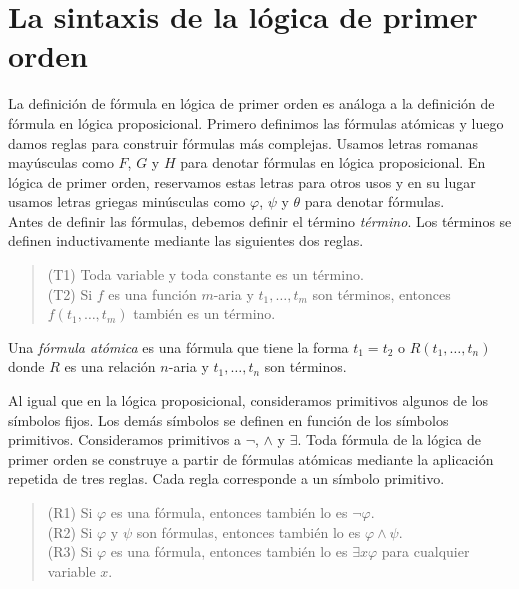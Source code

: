 \documentclass[12pt,a4paper]{book}
\begin{document}
    \section{La sintaxis de la lógica de primer orden}

    La definición de fórmula en lógica de primer orden es análoga a la definición de fórmula en lógica proposicional.
    Primero definimos las fórmulas atómicas y luego damos reglas para construir fórmulas más complejas. Usamos letras
    romanas mayúsculas como $F$, $G$ y $H$ para denotar fórmulas en lógica proposicional. En lógica de primer orden,
    reservamos estas letras para otros usos y en su lugar usamos letras griegas minúsculas como $\varphi$, $\psi$ y $\theta$
    para denotar fórmulas.\\
    Antes de definir las fórmulas, debemos definir el término \textit{término}. Los términos se definen inductivamente
    mediante las siguientes dos reglas.

    \begin{quote}
        (T1) Toda variable y toda constante es un término.\\
        (T2) Si $f$ es una función $m$-aria y $t_{1},\dots,t_{m}$ son términos, entonces $f(t_{1},\dots,t_{m})$ también es un
        término.
    \end{quote}

    \begin{definicion}\label{def:formula-atomica-fol}
        Una \textit{fórmula atómica} es una fórmula que tiene la forma $t_{1}=t_{2}$ o $R(t_{1},\dots,t_{n})$ donde $R$ es
        una relación $n$-aria y $t_{1},\dots,t_{n}$ son términos.
    \end{definicion}

    Al igual que en la lógica proposicional, consideramos primitivos algunos de los símbolos fijos. Los demás símbolos se
    definen en función de los símbolos primitivos. Consideramos primitivos a $\neg$, $\wedge$ y $\exists$. Toda fórmula de
    la lógica de primer orden se construye a partir de fórmulas atómicas mediante la aplicación repetida de tres reglas.
    Cada regla corresponde a un símbolo primitivo.

    \begin{quote}
        (R1) Si $\varphi$ es una fórmula, entonces también lo es $\neg\varphi$.\\
        (R2) Si $\varphi$ y $\psi$ son fórmulas, entonces también lo es $\varphi\wedge\psi$.\\
        (R3) Si $\varphi$ es una fórmula, entonces también lo es $\exists x\varphi$ para cualquier variable $x$.
    \end{quote}
\end{document}

